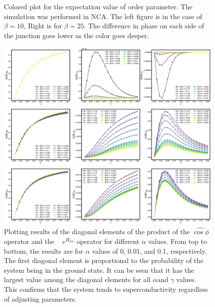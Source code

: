 \documentclass{article}[12pt]
\begin{document}
\begin{spacing}{1.5}
\begin{figure}[htbp]
  \caption{Colored plot for the expectation value of order parameter. The simulation was performed in NCA. The left figure is in the case of $\beta=10$, Right is for $\beta=25$.
  The difference in phase on each side of the junction goes lower as the color goes deeper.}
\end{figure}
\begin{figure}[htbp]
  \centerline{\includegraphics[width=17cm]{TexFigure/4_3_03_Matele_Ns3_alp0.png}}
  \centerline{\includegraphics[width=17cm]{TexFigure/4_3_04_Matele_Ns3_alp0_1.png}}
  \centerline{\includegraphics[width=17cm]{TexFigure/4_3_05_Matele_Ns3_alp1.png}}
  \caption{Plotting results of the diagonal elements of the product of the $\hat{\cos\phi}$ operator and the  
  $e^{H_{loc}}$ operator for different $\alpha$ values. From top to bottom, the results are for $\alpha$ 
  values of 0, 0.01, and 0.1, respectively. The first diagonal element is proportional to the probability of 
  the system being in the ground state. It can be seen that it has the largest value among the diagonal elements 
  for all $\alpha $and $\gamma$ values. This confirms that the system tends to superconductivity regardless of 
  adjusting parameters.}
  \end{figure}
\pagebreak

\end{spacing}
\end{document}
